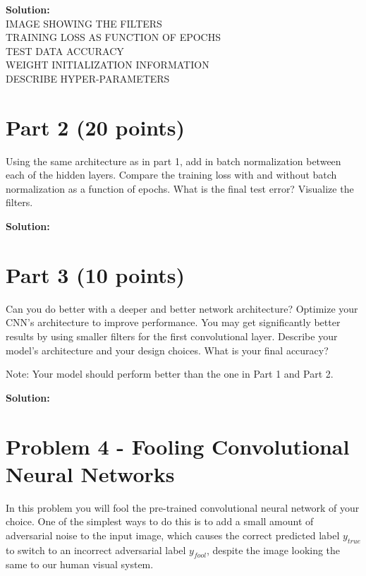 \documentclass[11pt, oneside]{article}   	%
\begin{document}
\textbf{Solution:}\\

IMAGE SHOWING THE FILTERS \\
TRAINING LOSS AS FUNCTION OF EPOCHS \\
TEST DATA ACCURACY \\
WEIGHT INITIALIZATION INFORMATION \\
DESCRIBE HYPER-PARAMETERS \\

\section*{Part 2 (20 points)}

Using the same architecture as in part 1, add in batch normalization between each of the hidden layers. Compare the training loss with and without batch normalization as a function of epochs. What is the final test error? Visualize the filters. 

\textbf{Solution:}\\



\section*{Part 3 (10 points)}
Can you do better with a deeper and better network architecture? Optimize your CNN's architecture to improve performance. You may get significantly better results by using smaller filters for the first convolutional layer. Describe your model's architecture and your design choices. What is your final accuracy?

Note: Your model should perform better than the one in Part 1 and Part 2.

\textbf{Solution:}\\





\section*{Problem 4 - Fooling Convolutional Neural Networks}

In this problem you will fool the pre-trained convolutional neural network of your choice. One of the simplest ways to do this is to add a small amount of adversarial noise to the input image, which causes the correct predicted label $y_{true}$ to switch to an incorrect adversarial label $y_{fool}$, despite the image looking the same to our human visual system. 
\end{document}
